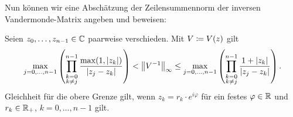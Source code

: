 Nun können wir eine Abschätzung der Zeilensummennorm der inversen
Vandermonde-Matrix angeben und beweisen:
\begin{theorem}
  \label{thm:inverse_vandermonde_inequality}
  Seien $z_0, \dots, z_{n-1} \in \mathbb{C}$ paarweise verschieden.
  Mit $V \coloneqq V \! \left( z \right)$ gilt
  \begin{equation}
    \label{eq:inverse_vandermonde_inequality}
    \max_{j = 0, \dots, n-1} \left( \prod_{\substack{k = 0\\ k \neq j}}^{n-1} \frac{\max(1, \left\lvert z_k \right\rvert)}{\left\lvert z_j - z_k \right\rvert} \right)
    < \left\lVert V^{-1} \right\rVert_{\infty}
    \leq \max_{j = 0, \dots, n-1} \left( \prod_{\substack{k = 0\\ k \neq j}}^{n-1} \frac{1 + \left\lvert z_k \right\rvert}{\left\lvert z_j - z_k \right\rvert} \right).
  \end{equation}
  Gleichheit für die obere Grenze gilt, wenn $z_k = r_k \cdot e^{i \varphi}$
  für ein festes $\varphi \in \mathbb{R}$ und $r_k \in \mathbb{R}_{+}$, $k = 0, \dots, n-1$ gilt.
\end{theorem}


